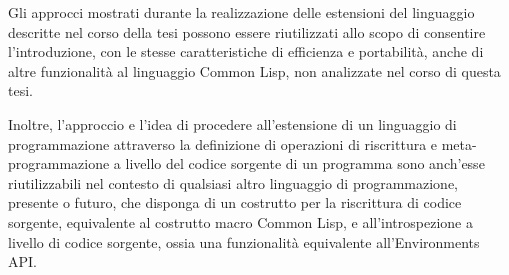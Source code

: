\documentclass{book}
\begin{document}
Gli approcci mostrati durante la realizzazione delle estensioni del linguaggio
descritte nel corso della tesi possono essere riutilizzati allo scopo di
consentire l'introduzione, con le stesse caratteristiche di efficienza e
portabilità, anche di altre funzionalità al linguaggio Common Lisp, non
analizzate nel corso di questa tesi.

Inoltre, l'approccio e l'idea di procedere all'estensione di un linguaggio di
programmazione attraverso la definizione di operazioni di riscrittura e
meta-programmazione a livello del codice sorgente di un programma sono anch'esse
riutilizzabili nel contesto di qualsiasi altro linguaggio di programmazione,
presente o futuro, che disponga di un costrutto per la riscrittura di codice
sorgente, equivalente al costrutto macro Common Lisp, e all'introspezione a
livello di codice sorgente, ossia una funzionalità equivalente all'Environments
API.

\printbibliography[filter=papers,title={Articoli Citati}]
\printbibliography[type=book,title={Bibliografia}]
\printbibliography[type=misc,title={Sitografia}]
\end{document}
